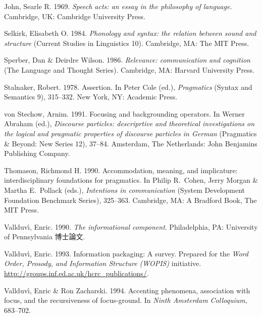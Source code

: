 \documentclass{goken}
\newcommand{\ori}[1]{\noindent\textcolor[gray]{0.7}{\fontsize{8pt}{8pt}\selectfont{\textsf{(p.~#1)}}} }
\begin{document}
\begin{thebibliography}{74}
John, Searle R. 1969.
\newblock \emph{Speech acts: an essay in the philosophy of language}.
\newblock Cambridge, UK: Cambridge University Press.

Selkirk, Elisabeth O. 1984.
\newblock \emph{Phonology and syntax: the relation between sound and structure}
  (Current Studies in Linguistics 10).
\newblock Cambridge, MA: The MIT Press.

Sperber, Dan \& Deirdre Wilson. 1986.
\newblock \emph{Relevance: communication and cognition} (The Language and
Thought Series).
\newblock Cambridge, MA: Harvard University Press.

Stalnaker, Robert. 1978.
\newblock Assertion.
\newblock In Peter Cole (ed.), \emph{Pragmatics} (Syntax and Semantics 9),
  315--332. New York, NY: Academic Press.

von Stechow, Arnim. 1991.
\newblock Focusing and backgrounding operators.
\newblock In Werner Abraham (ed.), \emph{Discourse particles: descriprtive and
	theoretical investigations \ori{69} on the logical and pragmatic properties of
  discourse particles in German} (Pragmatics \& Beyond: New Series 12), 37--84.
  Amsterdam, The Netherlands: John Benjamins Publishing Company.

Thomason, Richmond H. 1990.
\newblock Accommodation, meaning, and implicature: interdisciplinary
  foundations for pragmatics.
\newblock In Philip R.~Cohen, Jerry Morgan \& Martha E.~Pollack (eds.),
  \emph{Intentions in communication} (System Development Foundation Benchmark
  Series), 325--363. Cambridge, MA: A Bradford Book, The MIT Press.

Vallduv{\'\i}, Enric. 1990.
\newblock \emph{The informational component}.
\newblock Philadelphia, PA: University of Pennsylvania 博士論文.

Vallduv{\'\i}, Enric. 1993.
\newblock Information packaging: A survey.
\newblock Prepared for the \textit{Word Order, Prosody, and Information
  Structure (WOPIS)} initiative.
\newblock \urlprefix\url{http://groups.inf.ed.ac.uk/hcrc_publications/}.

Vallduv{\'\i}, Enric \& Ron Zacharski. 1994.
\newblock Accenting phenomena, association with focus, and the recursiveness of
  focus-ground.
\newblock In \emph{Ninth Amsterdam Colloquium}, 683--702.


\end{thebibliography}
\end{document}
